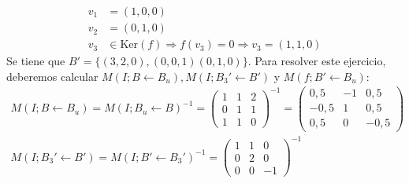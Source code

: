 \begin{ejercicio}
	\begin{align*}
		v_1 & = (1,0,0)                                                          \\
		v_2 & = (0,1,0)                                                          \\
		v_3 & \in \text{Ker}(f) \Rightarrow f(v_3) = 0 \Rightarrow v_3 = (1,1,0)
	\end{align*}
	Se tiene que $B' = \{(3,2,0),(0,0,1)(0,1,0)\}$.
	Para resolver este ejercicio, deberemos calcular $M(I;B \leftarrow B_u), M(I;B_3' \leftarrow B')$ y $M(f;B' \leftarrow B_u)$:
	\begin{align*}
		M(I;B \leftarrow B_u) = M(I;B_u \leftarrow B)^{-1} = \begin{pmatrix}
			                                                     1 & 1 & 2 \\
			                                                     0 & 1 & 1 \\
			                                                     1 & 1 & 0
		                                                     \end{pmatrix}^{-1} = \begin{pmatrix}
			                                                                          0,5  & -1 & 0,5  \\
			                                                                          -0,5 & 1  & 0,5  \\
			                                                                          0,5  & 0  & -0,5
		                                                                          \end{pmatrix} \\
		M(I;B_3' \leftarrow B') = M(I;B' \leftarrow B_3')^{-1} = \begin{pmatrix}
			                                                         1 & 1 & 0  \\
			                                                         0 & 2 & 0  \\
			                                                         0 & 0 & -1
		                                                         \end{pmatrix}^{-1}
	\end{align*}
\end{ejercicio}

